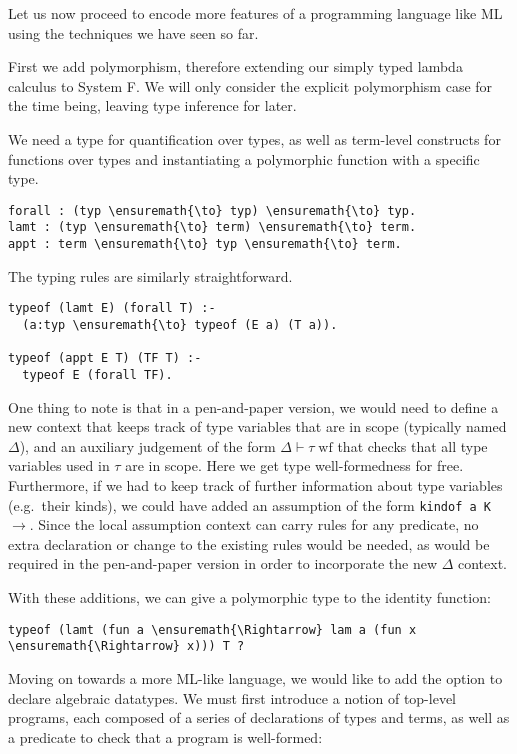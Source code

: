 Let us now proceed to encode more features of a programming language
like ML using the techniques we have seen so far.

First we add polymorphism, therefore extending our simply typed lambda
calculus to System F. We will only consider the explicit polymorphism
case for the time being, leaving type inference for later.

We need a type for quantification over types, as well as term-level
constructs for functions over types and instantiating a polymorphic
function with a specific type.

\begin{verbatim}
forall : (typ \ensuremath{\to} typ) \ensuremath{\to} typ.
lamt : (typ \ensuremath{\to} term) \ensuremath{\to} term.
appt : term \ensuremath{\to} typ \ensuremath{\to} term.
\end{verbatim}

The typing rules are similarly straightforward.

\begin{verbatim}
typeof (lamt E) (forall T) :-
  (a:typ \ensuremath{\to} typeof (E a) (T a)).

typeof (appt E T) (TF T) :-
  typeof E (forall TF).
\end{verbatim}

One thing to note is that in a pen-and-paper version, we would need to
define a new context that keeps track of type variables that are in
scope (typically named \(\Delta\)), and an auxiliary judgement of the
form \(\Delta \vdash \tau \; \text{wf}\) that checks that all type
variables used in \(\tau\) are in scope. Here we get type
well-formedness for free. Furthermore, if we had to keep track of
further information about type variables (e.g.~their kinds), we could
have added an assumption of the form
\texttt{kindof\ a\ K\ \ensuremath{\to}}. Since the local assumption
context can carry rules for any predicate, no extra declaration or
change to the existing rules would be needed, as would be required in
the pen-and-paper version in order to incorporate the new \(\Delta\)
context.

With these additions, we can give a polymorphic type to the identity
function:

\begin{verbatim}
typeof (lamt (fun a \ensuremath{\Rightarrow} lam a (fun x \ensuremath{\Rightarrow} x))) T ?
\end{verbatim}

Moving on towards a more ML-like language, we would like to add the
option to declare algebraic datatypes. We must first introduce a notion
of top-level programs, each composed of a series of declarations of
types and terms, as well as a predicate to check that a program is
well-formed:

